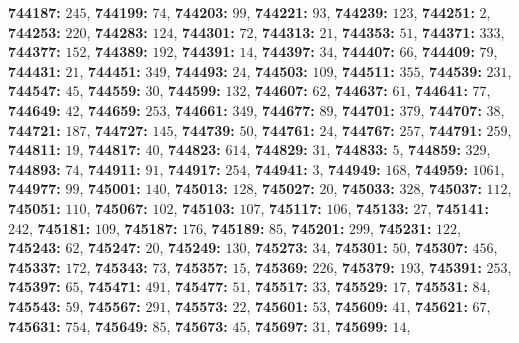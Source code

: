 \textsf{\bfseries 744187:} $245$, \textsf{\bfseries 744199:} $74$, \textsf{\bfseries 744203:} $99$, \textsf{\bfseries 744221:} $93$, \textsf{\bfseries 744239:} $123$, \textsf{\bfseries 744251:} $2$, \textsf{\bfseries 744253:} $220$, \textsf{\bfseries 744283:} $124$, \textsf{\bfseries 744301:} $72$, \textsf{\bfseries 744313:} $21$, \textsf{\bfseries 744353:} $51$, \textsf{\bfseries 744371:} $333$, \textsf{\bfseries 744377:} $152$, \textsf{\bfseries 744389:} $192$, \textsf{\bfseries 744391:} $14$, \textsf{\bfseries 744397:} $34$, \textsf{\bfseries 744407:} $66$, \textsf{\bfseries 744409:} $79$, \textsf{\bfseries 744431:} $21$, \textsf{\bfseries 744451:} $349$, \textsf{\bfseries 744493:} $24$, \textsf{\bfseries 744503:} $109$, \textsf{\bfseries 744511:} $355$, \textsf{\bfseries 744539:} $231$, \textsf{\bfseries 744547:} $45$, \textsf{\bfseries 744559:} $30$, \textsf{\bfseries 744599:} $132$, \textsf{\bfseries 744607:} $62$, \textsf{\bfseries 744637:} $61$, \textsf{\bfseries 744641:} $77$, \textsf{\bfseries 744649:} $42$, \textsf{\bfseries 744659:} $253$, \textsf{\bfseries 744661:} $349$, \textsf{\bfseries 744677:} $89$, \textsf{\bfseries 744701:} $379$, \textsf{\bfseries 744707:} $38$, \textsf{\bfseries 744721:} $187$, \textsf{\bfseries 744727:} $145$, \textsf{\bfseries 744739:} $50$, \textsf{\bfseries 744761:} $24$, \textsf{\bfseries 744767:} $257$, \textsf{\bfseries 744791:} $259$, \textsf{\bfseries 744811:} $19$, \textsf{\bfseries 744817:} $40$, \textsf{\bfseries 744823:} $614$, \textsf{\bfseries 744829:} $31$, \textsf{\bfseries 744833:} $5$, \textsf{\bfseries 744859:} $329$, \textsf{\bfseries 744893:} $74$, \textsf{\bfseries 744911:} $91$, \textsf{\bfseries 744917:} $254$, \textsf{\bfseries 744941:} $3$, \textsf{\bfseries 744949:} $168$, \textsf{\bfseries 744959:} $1061$, \textsf{\bfseries 744977:} $99$, \textsf{\bfseries 745001:} $140$, \textsf{\bfseries 745013:} $128$, \textsf{\bfseries 745027:} $20$, \textsf{\bfseries 745033:} $328$, \textsf{\bfseries 745037:} $112$, \textsf{\bfseries 745051:} $110$, \textsf{\bfseries 745067:} $102$, \textsf{\bfseries 745103:} $107$, \textsf{\bfseries 745117:} $106$, \textsf{\bfseries 745133:} $27$, \textsf{\bfseries 745141:} $242$, \textsf{\bfseries 745181:} $109$, \textsf{\bfseries 745187:} $176$, \textsf{\bfseries 745189:} $85$, \textsf{\bfseries 745201:} $299$, \textsf{\bfseries 745231:} $122$, \textsf{\bfseries 745243:} $62$, \textsf{\bfseries 745247:} $20$, \textsf{\bfseries 745249:} $130$, \textsf{\bfseries 745273:} $34$, \textsf{\bfseries 745301:} $50$, \textsf{\bfseries 745307:} $456$, \textsf{\bfseries 745337:} $172$, \textsf{\bfseries 745343:} $73$, \textsf{\bfseries 745357:} $15$, \textsf{\bfseries 745369:} $226$, \textsf{\bfseries 745379:} $193$, \textsf{\bfseries 745391:} $253$, \textsf{\bfseries 745397:} $65$, \textsf{\bfseries 745471:} $491$, \textsf{\bfseries 745477:} $51$, \textsf{\bfseries 745517:} $33$, \textsf{\bfseries 745529:} $17$, \textsf{\bfseries 745531:} $84$, \textsf{\bfseries 745543:} $59$, \textsf{\bfseries 745567:} $291$, \textsf{\bfseries 745573:} $22$, \textsf{\bfseries 745601:} $53$, \textsf{\bfseries 745609:} $41$, \textsf{\bfseries 745621:} $67$, \textsf{\bfseries 745631:} $754$, \textsf{\bfseries 745649:} $85$, \textsf{\bfseries 745673:} $45$, \textsf{\bfseries 745697:} $31$, \textsf{\bfseries 745699:} $14$, 
